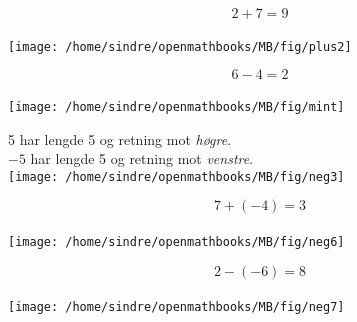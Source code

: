 \documentclass{beamer}
\begin{document}
\huge
\centering
\begin{frame}{}
\[ 2+7=9 \] \\ 
\vspace{30pt}
\texttt{[image: /home/sindre/openmathbooks/MB/fig/plus2]}
\end{frame}	

\begin{frame}{}
	\[ 6-4=2 \] \\ 
	\vspace{30pt}
	\texttt{[image: /home/sindre/openmathbooks/MB/fig/mint]}
\end{frame}	

\begin{frame}{}
\large
5 har lengde 5 og retning mot \textsl{høgre}.\\[12pt]
$ -5 $ har lengde 5 og retning mot \textsl{venstre}. \\[12pt]
	\vspace{30pt}
	\texttt{[image: /home/sindre/openmathbooks/MB/fig/neg3]}
\end{frame}	

\begin{frame}{}
	\[ 7+(-4)=3 \] \\ 
	\vspace{30pt}
	\texttt{[image: /home/sindre/openmathbooks/MB/fig/neg6]}
\end{frame}	

\begin{frame}{}
	\[ 2-(-6)=8 \] \\ 
	\vspace{30pt}
	\texttt{[image: /home/sindre/openmathbooks/MB/fig/neg7]}
\end{frame}	
\end{document}
